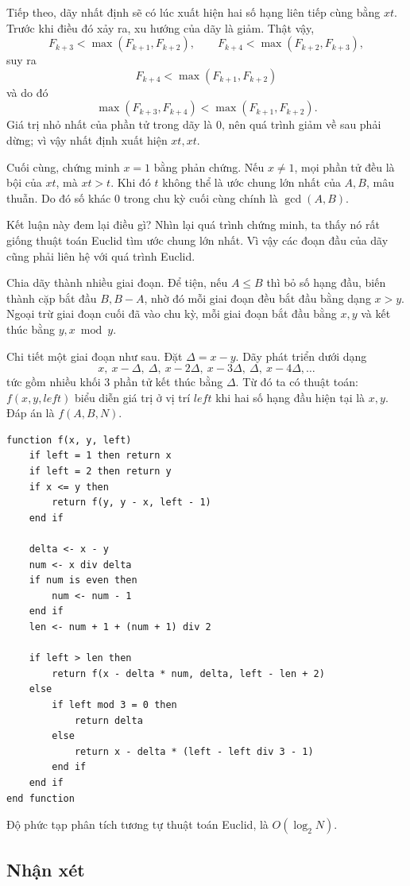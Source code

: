 \documentclass[11pt]{article}
\begin{document}
Tiếp theo, dãy nhất định sẽ có lúc xuất hiện hai số hạng liên tiếp cùng bằng
$xt$. Trước khi điều đó xảy ra, xu hướng của dãy là giảm. Thật vậy,
\[
  F_{k+3}<\max(F_{k+1},F_{k+2}),\qquad
  F_{k+4}<\max(F_{k+2},F_{k+3}),
\]
suy ra
\[
  F_{k+4}<\max(F_{k+1},F_{k+2})
\]
và do đó
\[
  \max(F_{k+3},F_{k+4})<\max(F_{k+1},F_{k+2}).
\]
Giá trị nhỏ nhất của phần tử trong dãy là $0$, nên quá trình giảm về sau phải
dừng; vì vậy nhất định xuất hiện $xt,xt$.

Cuối cùng, chứng minh $x=1$ bằng phản chứng. Nếu $x\ne1$, mọi phần tử đều là
bội của $xt$, mà $xt>t$. Khi đó $t$ không thể là ước chung lớn nhất của $A,B$,
mâu thuẫn. Do đó số khác $0$ trong chu kỳ cuối cùng chính là $\gcd(A,B)$.

Kết luận này đem lại điều gì? Nhìn lại quá trình chứng minh, ta thấy nó rất
giống thuật toán Euclid tìm ước chung lớn nhất. Vì vậy các đoạn đầu của dãy
cũng phải liên hệ với quá trình Euclid.

Chia dãy thành nhiều giai đoạn. Để tiện, nếu $A\le B$ thì bỏ số hạng đầu, biến
thành cặp bắt đầu $B,B-A$, nhờ đó mỗi giai đoạn đều bắt đầu bằng dạng $x>y$.
Ngoại trừ giai đoạn cuối đã vào chu kỳ, mỗi giai đoạn bắt đầu bằng $x,y$ và
kết thúc bằng $y,x\bmod y$.

Chi tiết một giai đoạn như sau. Đặt $\Delta=x-y$. Dãy phát triển dưới dạng
\[
  x,\ x-\Delta,\ \Delta,\ x-2\Delta,\ x-3\Delta,\ \Delta,\ x-4\Delta,\ldots
\]
tức gồm nhiều khối $3$ phần tử kết thúc bằng $\Delta$. Từ đó ta có thuật toán:
$f(x,y,\mathit{left})$ biểu diễn giá trị ở vị trí $\mathit{left}$ khi hai số
hạng đầu hiện tại là $x,y$. Đáp án là $f(A,B,N)$.

\begin{lstlisting}
function f(x, y, left)
    if left = 1 then return x
    if left = 2 then return y
    if x <= y then
        return f(y, y - x, left - 1)
    end if

    delta <- x - y
    num <- x div delta
    if num is even then
        num <- num - 1
    end if
    len <- num + 1 + (num + 1) div 2

    if left > len then
        return f(x - delta * num, delta, left - len + 2)
    else
        if left mod 3 = 0 then
            return delta
        else
            return x - delta * (left - left div 3 - 1)
        end if
    end if
end function
\end{lstlisting}

Độ phức tạp phân tích tương tự thuật toán Euclid, là $O(\log_2 N)$.

\subsection{Nhận xét}
\end{document}
